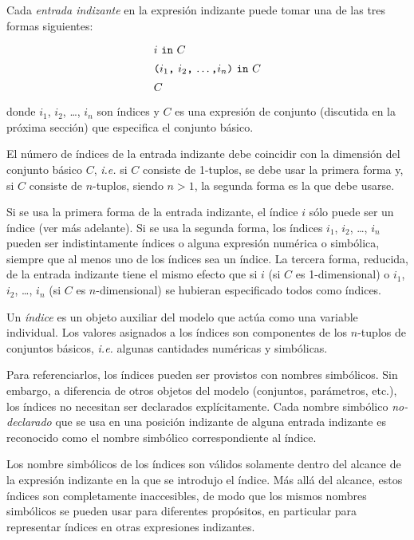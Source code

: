\documentclass[11pt,spanish]{report}
\begin{document}
Cada {\it entrada indizante} en la expresión indizante puede tomar una de las tres formas siguientes:
$$
{\def\arraystretch{1.4}
\begin{array}{l}
\mbox{$i$ {\tt in} $C$}\\
\mbox{{\tt(}$i_1${\tt,} $i_2${\tt,} \dots{\tt,}$i_n${\tt)} {\tt in}
$C$}\\
\mbox{$C$}\\
\end{array}
}
$$
donde $i_1$, $i_2$, \dots, $i_n$ son índices y $C$ es una expresión de conjunto (discutida en la próxima sección) que especifica el conjunto básico.

El número de índices de la entrada indizante debe coincidir con la dimensión del conjunto básico $C$, {\it i.e.} si $C$ consiste de 1-tuplos, se debe usar la primera forma y, si $C$ consiste de $n$-tuplos, siendo $n>1$, la segunda forma es la que debe usarse.

Si se usa la primera forma de la entrada indizante, el índice $i$ sólo puede ser un índice (ver más adelante). Si se usa la segunda forma, los índices $i_1$, $i_2$, \dots, $i_n$ pueden ser indistintamente índices o alguna expresión numérica o simbólica, siempre que al menos uno de los índices sea un índice. La tercera forma, reducida, de la entrada indizante tiene el mismo efecto que si
$i$ (si $C$ es 1-dimensional) o $i_1$, $i_2$, \dots, $i_n$ (si $C$ es $n$-dimensional) se hubieran especificado todos como índices.

Un {\it índice} es un objeto auxiliar del modelo que actúa como una variable individual. Los valores asignados a los índices son componentes de los $n$-tuplos de conjuntos básicos, {\it i.e.} algunas cantidades numéricas y simbólicas.

Para referenciarlos, los índices pueden ser provistos con nombres simbólicos. Sin embargo, a diferencia de otros objetos del modelo (conjuntos, parámetros, etc.), los índices no necesitan ser declarados explícitamente. Cada nombre simbólico {\it no-declarado} que se usa en una posición indizante de alguna entrada indizante es reconocido como el nombre simbólico correspondiente al índice.

Los nombre simbólicos de los índices son válidos solamente dentro del alcance de la expresión indizante en la que se introdujo el índice. Más allá del alcance, estos índices son completamente inaccesibles, de modo que los mismos nombres simbólicos se pueden usar para diferentes propósitos, en particular para representar índices en otras expresiones indizantes.
\end{document}
